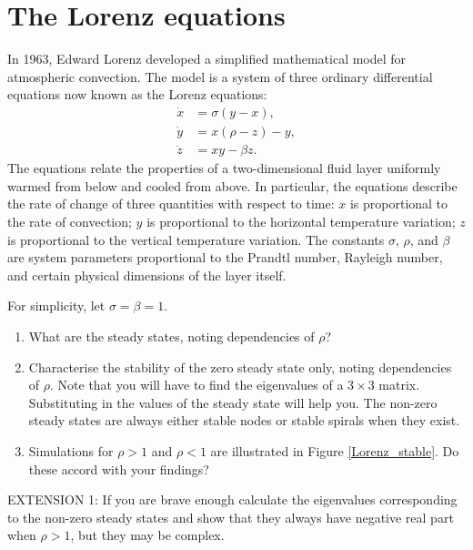 \documentclass[]{article}
\newcommand{\fig}[1]{Figure \ref{#1}}
\begin{document}
\section{The Lorenz equations}
In 1963, Edward Lorenz developed a simplified mathematical model for atmospheric convection. The model is a system of three ordinary differential equations now known as the Lorenz equations:
\begin{align}
\dot{x}&=\sigma (y-x),\\
\dot{y}&=x(\rho -z)-y,\\
\dot{z}&=xy-\beta z.
\end{align}
The equations relate the properties of a two-dimensional fluid layer uniformly warmed from below and cooled from above. In particular, the equations describe the rate of change of three quantities with respect to time: $x$ is proportional to the rate of convection; $y$ is proportional to the horizontal temperature variation; $z$ is proportional to the vertical temperature variation. The constants $\sigma$, $\rho$, and $\beta$ are system parameters proportional to the Prandtl number, Rayleigh number, and certain physical dimensions of the layer itself.

For simplicity, let $\sigma=\beta=1$.
\begin{enumerate}
\item What are the steady states, noting dependencies of $\rho$?
\item Characterise the stability of the  zero steady state only, noting dependencies of $\rho$. Note that you will have to find the eigenvalues of a $3\times 3$ matrix. Substituting in the values of the steady state will help you. The non-zero steady states are always either stable nodes or stable spirals when they exist.
\item Simulations for $\rho>1$ and $\rho<1$ are illustrated in \fig{Lorenz_stable}. Do these accord with your findings?
\end{enumerate}

EXTENSION 1: If you are brave enough calculate the eigenvalues corresponding to the non-zero steady states and show that they always have negative real part when $\rho>1$, but they may be complex.
\end{document}
